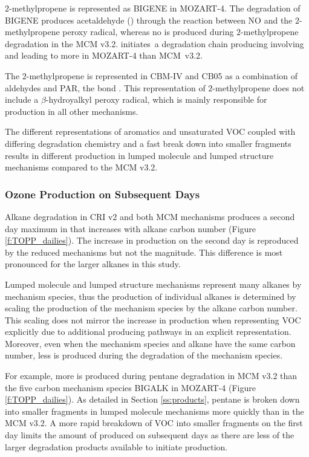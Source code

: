$2$-methylpropene is represented as BIGENE in MOZART-4. 
The degradation of BIGENE produces acetaldehyde () through the reaction between NO and the $2$-methylpropene peroxy radical, whereas no  is produced during $2$-methylpropene degradation in the MCM v3.2.
 \mbox{initiates a} degradation chain producing  involving  and  leading to more  in MOZART-4 than \mbox{MCM v3.2}.

The $2$-methylpropene is represented in CBM-IV and CB05 as a combination of aldehydes and PAR, the  bond \citep{Gery:1989, Yarwood:2005}.
This representation of $2$-methylpropene does not include a $\beta$-hydroyalkyl peroxy radical, which is mainly responsible for  production in all other mechanisms.

The different representations of aromatics and unsaturated VOC coupled with differing degradation chemistry and a fast break down into smaller fragments results in different  production in lumped molecule and lumped structure mechanisms compared to the MCM v3.2.

\subsubsection{Ozone Production on Subsequent Days} \label{sss:profiles} %

Alkane degradation in CRI v2 and both MCM mechanisms produces a second day maximum in  that increases with alkane carbon number (Figure \ref{f:TOPP_dailies}).
The increase in  production on the second day is reproduced by the reduced mechanisms but not the magnitude.
This difference is most pronounced for the larger alkanes in this study.

Lumped molecule and lumped structure mechanisms represent many alkanes by mechanism species, thus the  production of individual alkanes is determined by scaling the  production of the mechanism species by the alkane carbon number.
This scaling does not mirror the increase in  production when representing VOC explicitly due to additional  producing pathways in an explicit representation.
Moreover, even when the mechanism species and alkane have the same carbon number, less  is produced during the degradation of the mechanism species.

For example, more  is produced during pentane degradation in MCM v3.2 than the five carbon mechanism species BIGALK in MOZART-4 (Figure \ref{f:TOPP_dailies}).
As detailed in Section \ref{ss:products}, pentane is broken down into smaller fragments in lumped molecule mechanisms more quickly than in the MCM v3.2.
A more rapid breakdown of VOC into smaller fragments on the first day limits the amount of  produced on subsequent days as there are less of the larger degradation products available to initiate  production.

